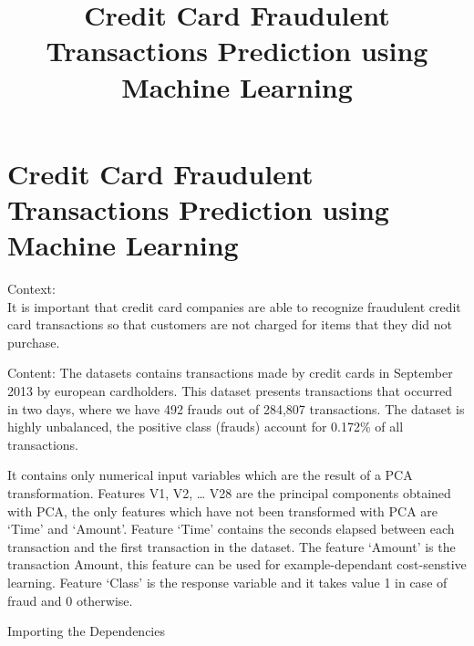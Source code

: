 \documentclass[11pt]{article}
\title{Credit Card Fraudulent Transactions Prediction using Machine Learning}
\begin{document}
    
    
    \maketitle
    
    

    
    \hypertarget{credit-card-fraudulent-transactions-prediction-using-machine-learning}{%
\section{Credit Card Fraudulent Transactions Prediction using Machine
Learning}\label{credit-card-fraudulent-transactions-prediction-using-machine-learning}}

    Context:\\
It is important that credit card companies are able to recognize
fraudulent credit card transactions so that customers are not charged
for items that they did not purchase.

    Content: The datasets contains transactions made by credit cards in
September 2013 by european cardholders. This dataset presents
transactions that occurred in two days, where we have 492 frauds out of
284,807 transactions. The dataset is highly unbalanced, the positive
class (frauds) account for 0.172\% of all transactions.

It contains only numerical input variables which are the result of a PCA
transformation. Features V1, V2, \ldots{} V28 are the principal
components obtained with PCA, the only features which have not been
transformed with PCA are `Time' and `Amount'. Feature `Time' contains
the seconds elapsed between each transaction and the first transaction
in the dataset. The feature `Amount' is the transaction Amount, this
feature can be used for example-dependant cost-senstive learning.
Feature `Class' is the response variable and it takes value 1 in case of
fraud and 0 otherwise.

    Importing the Dependencies
\end{document}
